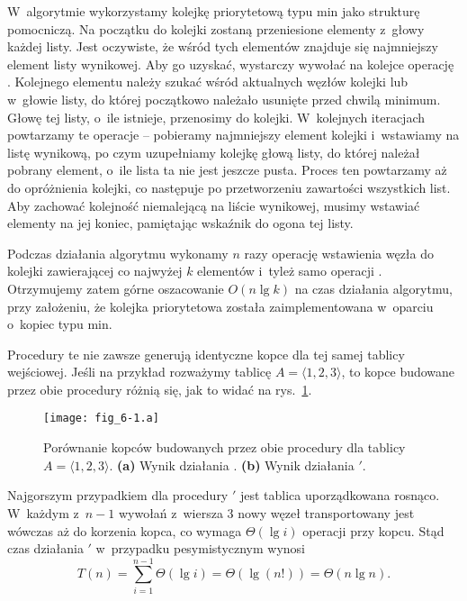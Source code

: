 \exercise %
W~algorytmie wykorzystamy kolejkę priorytetową typu min jako strukturę pomocniczą.
Na początku do kolejki zostaną przeniesione elementy z~głowy każdej listy.
Jest oczywiste, że wśród tych elementów znajduje się najmniejszy element listy wynikowej.
Aby go uzyskać, wystarczy wywołać na kolejce operację .
Kolejnego elementu należy szukać wśród aktualnych węzłów kolejki lub w~głowie listy, do której początkowo należało usunięte przed chwilą minimum.
Głowę tej listy, o~ile istnieje, przenosimy do kolejki.
W~kolejnych iteracjach powtarzamy te operacje -- pobieramy najmniejszy element kolejki i~wstawiamy na listę wynikową, po czym uzupełniamy kolejkę głową listy, do której należał pobrany element, o~ile lista ta nie jest jeszcze pusta.
Proces ten powtarzamy aż do opróżnienia kolejki, co następuje po przetworzeniu zawartości wszystkich list.
Aby zachować kolejność niemalejącą na liście wynikowej, musimy wstawiać elementy na jej koniec, pamiętając wskaźnik do ogona tej listy.

Podczas działania algorytmu wykonamy $n$ razy operację wstawienia węzła do kolejki zawierającej co najwyżej $k$ elementów i~tyleż samo operacji .
Otrzymujemy zatem górne oszacowanie $O(n\lg k)$ na czas działania algorytmu, przy założeniu, że kolejka priorytetowa została zaimplementowana w~oparciu o~kopiec typu min.

\problems


\subproblem %
Procedury te nie zawsze generują identyczne kopce dla tej samej tablicy wejściowej.
Jeśli na przykład rozważymy tablicę $A=\langle1,2,3\rangle$, to kopce budowane przez obie procedury różnią się, jak to widać na rys.\ \ref{fig:6-1(a)}.
\begin{figure}[ht]
	\begin{center}
		\texttt{[image: fig\_6-1.a]}
	\end{center}
	\caption{Porównanie kopców budowanych przez obie procedury dla tablicy $A=\langle1,2,3\rangle$.
{\sffamily\bfseries(a)} Wynik działania .
{\sffamily\bfseries(b)} Wynik działania $'$.} \label{fig:6-1(a)}
\end{figure}

\subproblem %
Najgorszym przypadkiem dla procedury $'$ jest tablica uporządkowana rosnąco.
W~każdym z~$n-1$ wywołań  z~wiersza 3 nowy węzeł transportowany jest wówczas aż do korzenia kopca, co wymaga $\Theta(\lg i)$ operacji przy  kopcu.
Stąd czas działania $'$ w~przypadku pesymistycznym wynosi
\[
	T(n) = \sum_{i=1}^{n-1}\Theta(\lg i) = \Theta(\lg(n!)) = \Theta(n\lg n).
\]

